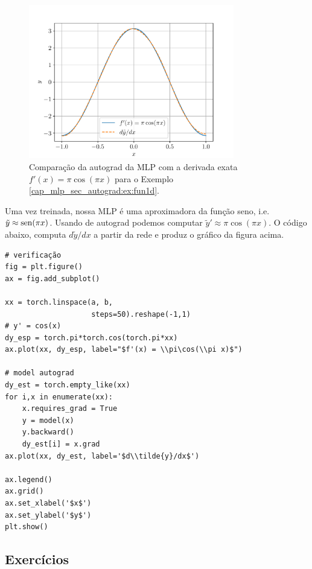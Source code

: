 \begin{ex}
  \begin{figure}[H]
    \centering
    \includegraphics[width=0.8\textwidth]{./cap_mlp/dados/fig_autograd_fun1d/fig}
    \caption{Comparação da autograd da MLP com a derivada exata $f'(x)=\pi\cos(\pi x)$ para o Exemplo \ref{cap_mlp_sec_autograd:ex:fun1d}.}
    \label{cap_mlp_sec_autograd:fig:fun1d}
  \end{figure}

  Uma vez treinada, nossa MLP é uma aproximadora da função seno, i.e. $\tilde{y} \approx \operatorname{sen}(\pi x)$. Usando de autograd podemos computar $\tilde{y}' \approx \pi\cos(\pi x)$. O código abaixo, computa $d\tilde{y}/dx$ a partir da rede e produz o gráfico da figura acima.

\begin{lstlisting}
# verificação
fig = plt.figure()
ax = fig.add_subplot()

xx = torch.linspace(a, b,
                    steps=50).reshape(-1,1)
# y' = cos(x)
dy_esp = torch.pi*torch.cos(torch.pi*xx)
ax.plot(xx, dy_esp, label="$f'(x) = \\pi\cos(\\pi x)$")

# model autograd
dy_est = torch.empty_like(xx)
for i,x in enumerate(xx):
    x.requires_grad = True
    y = model(x)
    y.backward()
    dy_est[i] = x.grad
ax.plot(xx, dy_est, label='$d\\tilde{y}/dx$')

ax.legend()
ax.grid()
ax.set_xlabel('$x$')
ax.set_ylabel('$y$')
plt.show()
\end{lstlisting}
\end{ex}

\subsection{Exercícios}

